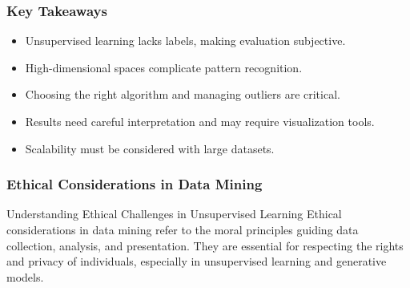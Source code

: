 \documentclass[aspectratio=169]{beamer}
\begin{document}
\begin{frame}[fragile]
    \frametitle{Key Takeaways}
    \begin{itemize}
        \item Unsupervised learning lacks labels, making evaluation subjective.
        \item High-dimensional spaces complicate pattern recognition.
        \item Choosing the right algorithm and managing outliers are critical.
        \item Results need careful interpretation and may require visualization tools.
        \item Scalability must be considered with large datasets.
    \end{itemize}
\end{frame}

\begin{frame}[fragile]
  \frametitle{Ethical Considerations in Data Mining}
  \begin{block}{Understanding Ethical Challenges in Unsupervised Learning}
      Ethical considerations in data mining refer to the moral principles guiding data collection, analysis, and presentation. They are essential for respecting the rights and privacy of individuals, especially in unsupervised learning and generative models.
  \end{block}
\end{frame}
\end{document}
